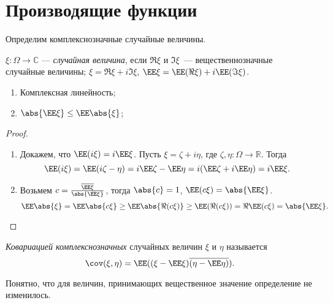 \section{Производящие функции}

Определим комплекснозначные случайные величины.

 \begin{definition}
     $\xi\colon \Omega\rightarrow\mathbb{C}$ --- \textit{случайная величина}, если $\Re\xi$ и $\Im\xi$~--- вещественнозначные случайные величины;
     $\xi = \Re\xi + i\Im\xi$, $\EE \xi = \EE (\Re\xi) + i\EE (\Im\xi)$.
 \end{definition}

 \begin{properties}
\enewline
     \begin{enumerate}
         \item Комплексная линейность;
                

         \item $\abs{\EE \xi} \le \EE \abs{\xi}$;

               
     \end{enumerate}
 \end{properties}

\begin{proof}
 \enewline
     \begin{enumerate}
         \item Докажем, что $\EE (i\xi) = i\EE \xi$. Пусть $\xi = \zeta + i\eta$, где $\zeta, \eta\colon \Omega\rightarrow\mathbb{R}$. Тогда
               $$\EE (i\xi) = \EE (i\zeta - \eta) = i\EE \zeta - \EE \eta = i(\EE \zeta + i\EE \eta) = i\EE \xi.$$
               \item Возьмем $c=\frac{\overline{\EE \xi}}{\abs{\EE \xi}}$, тогда $\abs{c} = 1$, $\EE (c\xi) = \abs{\EE \xi}$.
               $$\EE \abs{\xi} = \EE \abs{c\xi} \ge \EE \abs{\Re(c\xi)} \ge \EE (\Re(c\xi)) = \Re \EE (c\xi) = \abs{\EE \xi}.$$
               \qedhere
     \end{enumerate}
\end{proof}
 \begin{definition} \textit{Ковариацией комплекснозначных} случайных величин $\xi$ и $\eta$ называется
     $$\cov (\xi, \eta) = \EE ((\xi -\EE \xi)\overline{(\eta - \EE \eta)}).$$
 \end{definition}
 
 Понятно, что для величин, принимающих вещественное значение определение не изменилось.
 
